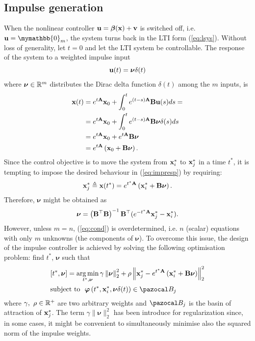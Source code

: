 \subsection{Impulse generation}
When the nonlinear controller $\mathbf{u}=\bm\beta(\mathbf{x})+\mathbf{v}$ is switched off, i.e. $\ub=\mymathbb{0}_m$, the system turns back in the LTI form (\ref{eq:lsys}).
Without loss of generality, let $t = 0$ and let the LTI system be controllable. The response of the system to a weighted impulse input 
%
\begin{equation}
\mathbf{u}(t) = \bm\nu\delta(t)
\end{equation}
%
where $\bm\nu\in\mathbb{R}^m$ distributes the Dirac delta function $\delta(t)$ among the $m$ inputs,
is
%
\begin{align}\label{eq:impresp}
    \mathbf{x}(t) &= e^{t\mathbf{A}}\mathbf{x}_0 + \int_0^te^{(t-s)\mathbf{A}}\mathbf{B} \mathbf{u}(s)ds =\nonumber\\
    &= e^{t\mathbf{A}}\mathbf{x}_0 + \int_0^te^{(t-s)\mathbf{A}}\mathbf{B}\bm\nu\delta(s)ds \nonumber\\
    &= e^{t\mathbf{A}}\mathbf{x}_0 + e^{t\mathbf{A}}\mathbf{B}\bm\nu\\
    &= e^{t\mathbf{A}}\left(\mathbf{x}_0 + \mathbf{B}\bm\nu\right) .
\end{align}
%
Since the control objective is to move the system from $\mathbf{x}_i^*$ to $\mathbf{x}_j^*$ in a time $t^*$, it is tempting to impose the desired behaviour in (\ref{eq:impresp}) by requiring:
%
\begin{equation}\label{eq:cond}
    \mathbf{x}_j^* \triangleq \mathbf{x}(t^*) = e^{t^*\mathbf{A}}\left(\mathbf{x}_i^* + \mathbf{B}\bm\nu\right).
\end{equation}
%
Therefore, $\bm\nu$ might be obtained as
\begin{align}
    \bm\nu = \left(\mathbf{B}^\top\mathbf{B}\right)^{-1}\mathbf{B}^\top(e^{-t^*\mathbf{A}}\mathbf{x}_j^*-\mathbf{x}_i^*).
\end{align}
%
However, unless $m = n$, (\ref{eq:cond}) is overdetermined, i.e. $n$ (scalar) equations with only $m$ unknowns (the components of $\bm\nu$). 
To overcome this issue, the design of the impulse controller is achieved by solving the following optimisation problem: 
find $t^*$, $\bm\nu$ such that 
%
\begin{equation}\label{eq:opti}
\begin{aligned}
& [t^*,\bm\nu] = \argmin\limits_{t^*,\bm\nu}\gamma\left\|\bm\nu \right\|^2_2+\rho\left\|\xb_j^* - e^{t^*\Ab}\left(\xb_i^*+\Bb\bm\nu\right)\right\|^2_2\\
& \text{subject to} ~~\bm\varphi\left(t^*,\xb_i^*,\bm\nu\delta(t)\right)\in\B_j
\end{aligned}
\end{equation}
where $\gamma,~\rho\in \mathbb{R}^+$ are two arbitrary weights and  $\B_j$ is the basin of attraction of $\mathbf{x}_j^*$. 
The term $\gamma\|\bm\nu\|_2^2$ has been introduce for regularization since, in some cases, it might be convenient to simultaneously minimise also the squared norm of the impulse weights.
%

